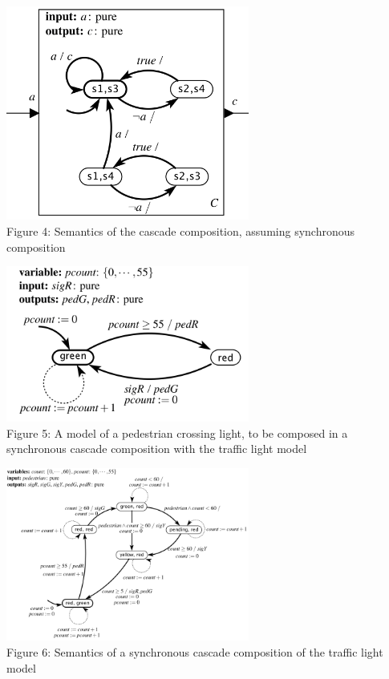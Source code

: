 \documentclass[10pt,landscape]{article}
\begin{document}
\begin{multicols}{3}
\begin{center}
\includegraphics*[width = 8cm]{Fig4.png}\\
Figure 4: Semantics of the cascade composition, assuming synchronous composition
\end{center}

\begin{center}
\includegraphics*[width = 8cm]{Fig5.png}\\
Figure 5: A model of a pedestrian crossing light, to be composed in a synchronous cascade composition with the traffic light model
\end{center}

\begin{center}
\includegraphics*[width = 8cm]{Fig6.png}\\
Figure 6: Semantics of a synchronous cascade composition of the traffic light model
\end{center}


\end{multicols}
\end{document}
